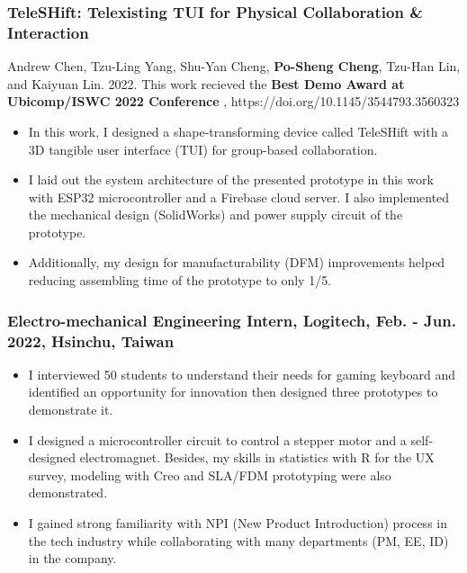 \documentclass[12pt]{article}
\begin{document}
    \subsubsection*{TeleSHift: Telexisting TUI for Physical Collaboration \& Interaction}
    {\sffamily
    {\footnotesize Andrew Chen, Tzu-Ling Yang, Shu-Yan Cheng, \textbf{Po-Sheng Cheng}, Tzu-Han Lin, and Kaiyuan Lin. 2022. This work recieved the \textbf{Best Demo Award at Ubicomp/ISWC 2022 Conference}%
    , https://doi.org/10.1145/3544793.3560323}
        \begin{itemize}
            \item In this work, I designed a shape-transforming device called TeleSHift with a 3D tangible user interface (TUI) for group-based collaboration.
            \item I laid out the system architecture of the presented prototype in this work with ESP32 microcontroller and a Firebase cloud server. I also implemented the mechanical design (SolidWorks) and power supply circuit of the prototype.
            \item Additionally, my design for manufacturability (DFM) improvements helped reducing assembling time of the prototype to only 1/5.
        \end{itemize}
        }
        \subsubsection*{Electro-mechanical Engineering Intern, Logitech, Feb. - Jun. 2022, Hsinchu, Taiwan}
        {\sffamily
        \begin{itemize}
            \item I interviewed 50 students to understand their needs for gaming keyboard and identified an opportunity for innovation then designed three prototypes to demonstrate it.
            \item I designed a microcontroller circuit to control a stepper motor and a self-designed electromagnet. Besides, my skills in statistics with R for the UX survey, modeling with Creo and SLA/FDM prototyping were also demonstrated.
            \item I gained strong familiarity with NPI (New Product Introduction) process in the tech industry while collaborating with many departments (PM, EE, ID) in the company.
        \end{itemize}
        }
\end{document}
